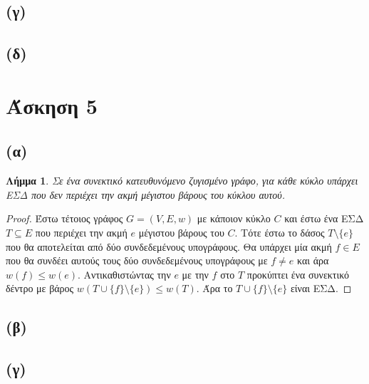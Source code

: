 \documentclass[11pt,a4paper]{book}
\newtheorem*{lemma}{Λήμμα}
\begin{document}
\subsection*{(γ)}
\subsection*{(δ)}

\section*{Άσκηση 5}
\subsection*{(α)}
\begin{lemma}
Σε ένα συνεκτικό κατευθυνόμενο ζυγισμένο γράφο, για κάθε κύκλο υπάρχει ΕΣΔ που δεν περιέχει την ακμή μέγιστου βάρους του κύκλου αυτού.
\end{lemma}

\begin{proof}
Έστω τέτοιος γράφος $G = (V, E, w)$ με κάποιον κύκλο $C$ και έστω ένα ΕΣΔ $T \subseteq E$ που περιέχει την ακμή $e$ μέγιστου βάρους του $C$. Τότε έστω το δάσος $T \setminus \{ e \}$ που θα αποτελείται από δύο συνδεδεμένους υπογράφους. Θα υπάρχει μία ακμή $f \in E$ που θα συνδέει αυτούς τους δύο συνδεδεμένους υπογράφους με $f \neq e$ και άρα $w( f ) \leq w( e )$. Αντικαθιστώντας την $e$ με την $f$ στο $T$ προκύπτει ένα συνεκτικό δέντρο με βάρος $w( T \cup \{ f \} \setminus \{ e \} ) \leq w( T )$. Άρα το $T \cup \{ f \} \setminus \{ e \}$ είναι ΕΣΔ.
\end{proof}

\subsection*{(β)}
\subsection*{(γ)}
\end{document}
